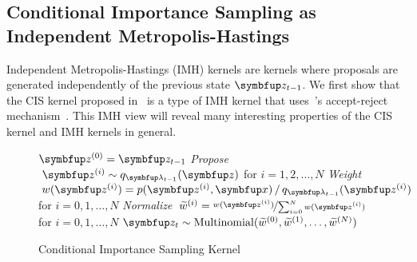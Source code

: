 %
\subsection{Conditional Importance Sampling as Independent Metropolis-Hastings}\label{section:cis_imh}
Independent Metropolis-Hastings (IMH) kernels are kernels where proposals are generated independently of the previous state \(\vz_{t-1}\).
We first show that the CIS kernel proposed in~\citep{NEURIPS2020_b2070693} is a type of IMH kernel that uses~\citeauthor{barker_monte_1965}'s accept-reject mechanism~\citep{barker_monte_1965}.
This IMH view will reveal many interesting properties of the CIS kernel and IMH kernels in general.


\begin{figure}
  \small
  \begin{algorithm2e}[H]
    \DontPrintSemicolon
    \SetAlgoLined
    \(\vz^{(0)} = \vz_{t-1}\) \;
    \textit{Propose} \(\;\vz^{(i)} \sim q_{\vlambda_{t-1}}(\vz)\) for \(i = 1, 2,\ldots, N\) \;
    \textit{Weight} \(\;w(\vz^{(i)}) = p(\vz^{(i)},\vx) \,/\, q_{\vlambda_{t-1}}(\vz^{(i)}) \) for \(i = 0, 1,\ldots, N\)\;
    \textit{Normalize} \(\;\widetilde{w}^{(i)} = \nicefrac{w(\vz^{(i)})}{ \sum^{N}_{i=0} w(\vz^{(i)}) }\) for \(i = 0, 1,\ldots, N\)\;
    \(\vz_{t} \sim \mathrm{Multinomial}(\widetilde{w}^{(0)}, \widetilde{w}^{(1)}, \ldots, \widetilde{w}^{(N)}) \)\;
    \caption{Conditional Importance Sampling Kernel}\label{alg:cis}
  \end{algorithm2e}
\end{figure}
%
